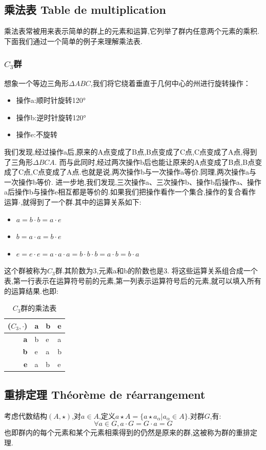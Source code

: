 \documentclass[12pt, a4paper, oneside]{ctexbook}
\begin{document}
  \subsection{乘法表 Table de multiplication}
  乘法表常被用来表示简单的群上的元素和运算,它列举了群内任意两个元素的乘积.下面我们通过一个简单的例子来理解乘法表.
  \subsubsection{$C_3$群}\label{myref:C_3}
  想象一个等边三角形$\Delta ABC$,我们将它绕着垂直于几何中心的州进行旋转操作：
  \begin{itemize}
    \item 操作a:顺时针旋转120°
    \item 操作b:逆时针旋转120°
    \item 操作e:不旋转
  \end{itemize}
  我们发现,经过操作a后,原来的A点变成了B点,B点变成了C点,C点变成了A点,得到了三角形$\Delta BCA$.
  而与此同时,经过两次操作b后也能让原来的A点变成了B点,B点变成了C点,C点变成了A点.也就是说,两次操作b与一次操作a等价.同理,两次操作a与一次操作b等价.
  进一步地,我们发现,三次操作a、三次操作b、操作b后操作a、操作a后操作b与操作e相互都是等价的.如果我们把操作看作一个集合,操作的复合看作运算$\cdot $,就得到了一个群.其中的运算关系如下:
    \begin{itemize}
    \item $a=b\cdot b=a\cdot e$
    \item $b=a\cdot a=b\cdot e$
    \item $e=e\cdot e=a\cdot a\cdot a=b\cdot b\cdot b=a\cdot b=b\cdot a$
    \end{itemize}
  这个群被称为$C_3$群.其阶数为3,元素a和b的阶数也是3.
  将这些运算关系组合成一个表,第一行表示在运算符号前的元素,第一列表示运算符号后的元素,就可以填入所有的运算结果.也即:
  \begin{table}[!h]
    \centering
    \begin{tabular}{r|lll}
         ($C_3,\cdot$) & \textbf{a} & \textbf{b} & \textbf{e} \\ \hline
        \textbf{a} & b & e & a \\ 
        \textbf{b} & e & a & b \\ 
        \textbf{e} & a & b & e \\ 
    \end{tabular}
    \caption{$C_3$群的乘法表}
    \label{C_3times}
  \end{table}
  \subsection{重排定理 Théorème de réarrangement}
  考虑代数结构$(A,\star)$,对$a\in A$,定义$a\star A=\{ a\star a_\alpha|a_\alpha \in A \}$.对群$G$,有:
  $$
  \forall a\in G,a\cdot G=G\cdot a=G
  $$也即群内的每个元素和某个元素相乘得到的仍然是原来的群,这被称为群的重排定理.
\end{document}
